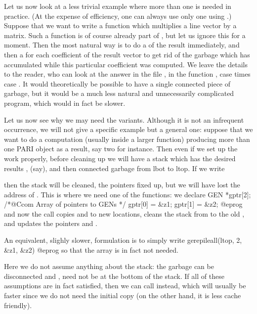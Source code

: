 Let us now look at a less trivial example where more than one 
is needed in practice. (At the expense of efficiency, one can always use only
one using .) Suppose that we want to write a function
which multiplies a line vector by a matrix. Such a function is of course
already part of , but let us ignore this for a moment. Then the
most natural way is to do a  of the result immediately, and then a
 for each coefficient of the result vector to get rid of the
garbage which has accumulated while this particular coefficient was computed.
We leave the details to the reader, who can look at the answer in the file
, in the function , case  times case
. It would theoretically be possible to have a single connected
piece of garbage, but it would be a much less natural and unnecessarily
complicated program, which would in fact be slower.


Let us now see why we may need the  variants. Although it
is not an infrequent occurrence, we will not give a specific example but a
general one: suppose that we want to do a computation (usually inside a
larger function) producing more than one PARI object as a result, say two for
instance. Then even if we set up the work properly, before cleaning up we
will have a stack which has the desired results ,  (say), and
then connected garbage from lbot to ltop. If we write


\noindent
then the stack will be cleaned, the pointers fixed up, but we will have lost
the address of . This is where we need one of the 
functions: we declare
\bprog
  GEN *gptr[2]; /*@Ccom Array of pointers to GENs */
  gptr[0] = &z1; gptr[1] = &z2;
@eprog
\noindent and now the call  copies 
and  to new locations, cleans the stack from  to the old
, and updates the pointers  and .

An equivalent, slighly slower, formulation is to simply write
\bprog
  gerepileall(ltop, 2, &z1, &z2)
@eprog
so that the array  is in fact not needed.

Here we do not assume anything about the stack: the garbage can be
disconnected and ,  need not be at the bottom of the stack.
If all of these assumptions are in fact satisfied, then we can call
 instead, which will usually be faster since we do not
need the initial copy (on the other hand, it is less cache friendly).

